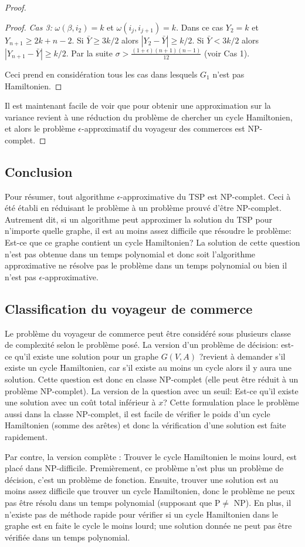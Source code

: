 \documentclass[../main.tex]{subfiles}
\begin{document}
\begin{proof}
\begin{proof}
\emph{Cas 3:} $\omega (\beta, i_2) = k$ et $\omega (i_j, i_{j+1})=k$. Dans ce cas $Y_2=k$ et $Y_{n+1} \geq 2k+n-2$. Si $\bar{Y} \geq 3k/2$ alors $|Y_2 - \bar{Y}| \geq k/2$. Si $\bar{Y} < 3k/2$ alors $|Y_{n+1} - \bar{Y}| \geq k/2$. Par la suite $\sigma > \frac{(1+\epsilon)(n+1)(n-1)}{12}$ (voir Cas 1).

Ceci prend en considération tous les cas dans lesquels $G_1$ n'est pas Hamiltonien.
\end{proof}

Il est maintenant facile de voir que pour obtenir une approximation sur la variance revient à une réduction du problème de chercher un cycle Hamiltonien, et alors le problème $\epsilon$-approximatif du voyageur des commerces est NP-complet.

\end{proof}

\subsection{Conclusion}
Pour résumer, tout algorithme $\epsilon$-approximative du TSP est NP-complet. Ceci à été établi en réduisant le problème à un problème prouvé d'être NP-complet. Autrement dit, si un algorithme peut approximer la solution du TSP pour n'importe quelle graphe, il est au moins assez difficile que résoudre le problème: Est-ce que ce graphe contient un cycle Hamiltonien? La solution de cette question n'est pas obtenue dans un temps polynomial et donc soit l'algorithme approximative ne résolve pas le problème dans un temps polynomial ou bien il n'est pas $\epsilon$-approximative.

\subsection{Classification du voyageur de commerce}
Le problème du voyageur de commerce peut être considéré sous plusieurs classe de complexité selon le problème posé. La version d'un problème de décision: est-ce qu'il existe une solution pour un graphe $G(V,A)$ ?revient à demander s'il existe un cycle Hamiltonien, car s'il existe au moins un cycle alors il y aura une solution. Cette question est donc en classe NP-complet (elle peut être réduit à un problème NP-complet). La version de la question avec un seuil: Est-ce qu'il existe une solution avec un coût total inférieur à $x$? Cette formulation place le problème aussi dans la classe NP-complet, il est facile de vérifier le poids d'un cycle Hamiltonien (somme des arêtes) et donc la vérification d'une solution est faite rapidement.

Par contre, la version \og complète \fg{}: Trouver le cycle Hamiltonien le moins lourd, est placé dans NP-difficile. Premièrement, ce problème n'est plus un problème de décision, c'est un problème de fonction. Ensuite, trouver une solution est au moins assez difficile que trouver un cycle Hamiltonien, donc le problème ne peux pas être résolu dans un temps polynomial (supposant que P$\neq$ NP). En plus, il n'existe pas de méthode rapide pour vérifier si un cycle Hamiltonien dans le graphe est en faite le cycle le moins lourd; une solution donnée ne peut pas être vérifiée dans un temps polynomial.
\end{document}
